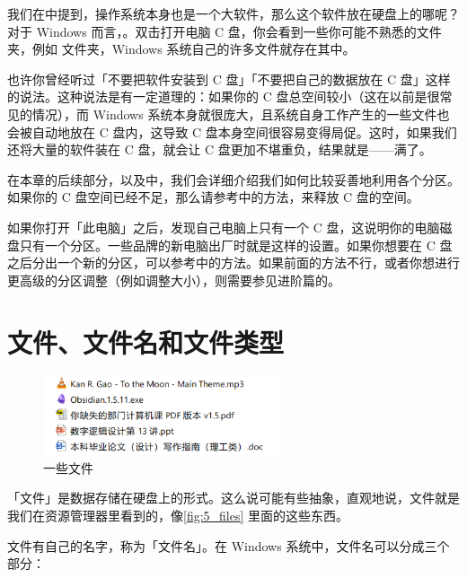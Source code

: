 我们在中提到，操作系统本身也是一个大软件，那么这个软件放在硬盘上的哪呢？对于 Windows 而言，。双击打开电脑 C 盘，你会看到一些你可能不熟悉的文件夹，例如  文件夹，Windows 系统自己的许多文件就存在其中。

也许你曾经听过「不要把软件安装到 C 盘」「不要把自己的数据放在 C 盘」这样的说法。这种说法是有一定道理的：如果你的 C 盘总空间较小（这在以前是很常见的情况），而 Windows 系统本身就很庞大，且系统自身工作产生的一些文件也会被自动地放在 C 盘内，这导致 C 盘本身空间很容易变得局促。这时，如果我们还将大量的软件装在 C 盘，就会让 C 盘更加不堪重负，结果就是——满了。

在本章的后续部分，以及中，我们会详细介绍我们如何比较妥善地利用各个分区。如果你的 C 盘空间已经不足，那么请参考中的方法，来释放 C 盘的空间。

\begin{note}
  如果你打开「此电脑」之后，发现自己电脑上只有一个 C 盘，这说明你的电脑磁盘只有一个分区。一些品牌的新电脑出厂时就是这样的设置。如果你想要在 C 盘之后分出一个新的分区，可以参考中的方法。如果前面的方法不行，或者你想进行更高级的分区调整（例如调整大小），则需要参见进阶篇的。
\end{note}

\section{文件、文件名和文件类型}

\begin{figure}
  \centering
  \includegraphics[width=7cm]{assets/basic/5_files.png}
  \caption{一些文件}
  \label{fig:5_files}
\end{figure}

「文件」是数据存储在硬盘上的形式。这么说可能有些抽象，直观地说，文件就是我们在资源管理器里看到的，像\autoref{fig:5_files} 里面的这些东西。

文件有自己的名字，称为「文件名」。在 Windows 系统中，文件名可以分成三个部分：

